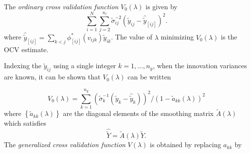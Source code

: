 \documentclass[12pt]{article}
\newcommand{\Hilbert}{\mathcal{H}}
\newcommand{\tildeY}{\tilde{Y}}
\newcommand{\tildey}{\tilde{y}}
\newcommand{\tildeA}{\tilde{A}}
\newtheorem{lemma}[theorem]{Lemma}
\theoremstyle{definition}
\begin{document}
The \emph{ordinary cross validation function} $V_0\left(\lambda\right)$ is given by 
\begin{equation}
\sum_{i=1}^{N} \sum_{j=2}^{n_i} \tilde{\sigma}_{ij}^{-2} \left( \tildey_{ij} -  \hat{\tildey}_{\left[ ij \right]}\right)^2.
\end{equation}
\bigskip
\noindent
where  $\hat{\tildey}_{\left[ ij \right]} = \sum_{k<j}\phi^*_{\left[ ij \right]}\left( v_{ijk} \right) \tildey_{ik}$. The value of $\lambda$ minimizing $V_0\left(\lambda\right)$ is the OCV estimate.%
%
%
%
%

Indexing the $\tildey_{ij}$ using a single integer $k = 1, \dots, n_y$, when the innovation variances are known, it can be shown that $V_0\left(\lambda\right)$ can be written 

\begin{equation}
V_0\left(\lambda\right) = \sum_{k=1}^{n_y} \left(\tilde{\sigma}_{k}^{-1} \left(\tildey_k - \hat{\tildey}_k\right) \right)^2/ \left(1-\tilde{a}_{kk}\left(\lambda\right)  \right)^2
\end{equation} 
\bigskip
\noindent
where $\left\{ \tilde{a}_{kk}\left( \lambda \right) \right\}$ are the diagonal elements of the smoothing matrix $\tilde{A}\left( \lambda \right)$ which satisfies
\[
\hat{\tildeY} = \tildeA\left(\lambda\right) \tildeY.
\]
\bigskip
The \emph{generalized cross validation function} $V\left(\lambda\right)$ is obtained by replacing $a_{kk}$ by 
\end{document}
